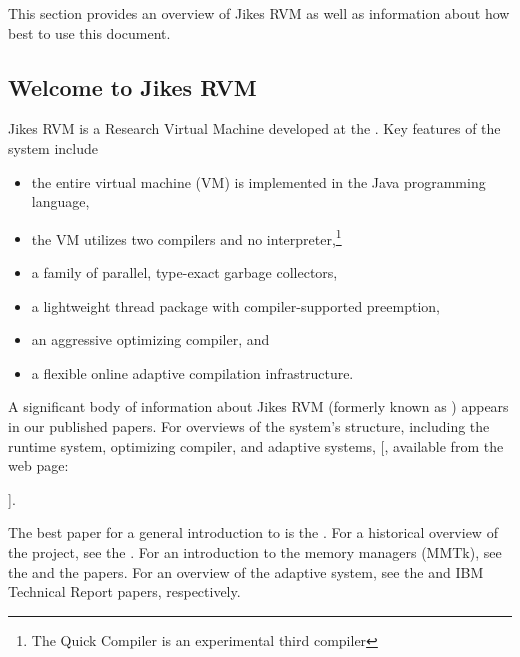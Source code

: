 This section provides an overview of Jikes\TMweb{} RVM as well as
information about how best to use this document.

\subsection{Welcome to Jikes RVM}

Jikes\TMboth{} RVM is a Research Virtual Machine 
 developed at the 
\Rboth{}
.  Key
features of the system include
\begin{itemize}
\item the entire virtual machine (VM) is implemented in the
  Java\TMboth{} programming language,
\item the VM utilizes two compilers and no interpreter,\footnote{The
Quick Compiler is an experimental third compiler}
\item a family of parallel, type-exact garbage collectors,
\item a lightweight thread package with compiler-supported preemption,
\item an aggressive optimizing compiler, and 
\item a flexible online adaptive compilation infrastructure.
\end{itemize}

A significant body of information about Jikes RVM 
(formerly known as 
\xlink{\jp}{\JalapenoHomeURL}) appears 
in our published
papers.  For overviews of the system's structure, including the runtime system,
optimizing compiler, and adaptive systems, [, available from the \jrvm{} web page:
\begin{quote}
\texttt{\RVMPubsURL}
\end{quote}
]{\RVMPubsURL}.

The best paper for a general introduction to \jrvm{} is the 
.  
For a historical overview of the project, see the
.
For an introduction to the memory managers (MMTk), see the 
 and the
 papers.
For an overview of the adaptive system, see the
and IBM Technical Report
papers, respectively.

